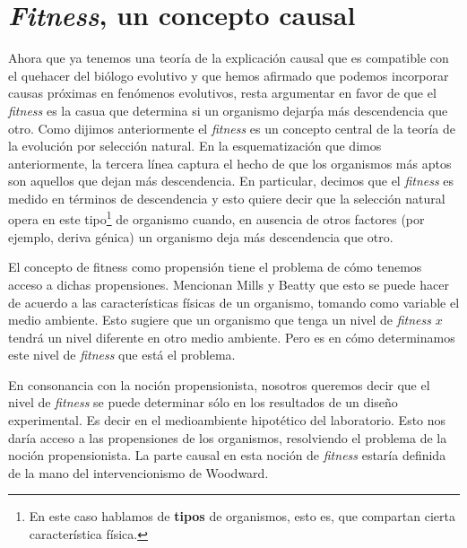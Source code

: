 \section{\emph{Fitness}, un concepto causal}

\noindent Ahora que ya tenemos una teoría de la explicación causal que es compatible con el quehacer del biólogo evolutivo y que hemos afirmado que podemos incorporar causas próximas en fenómenos evolutivos, resta argumentar en favor de que el \emph{fitness} es la casua que determina si un organismo dejarṕa más descendencia que otro. Como dijimos anteriormente el \emph{fitness} es un concepto central de la teoría de la evolución por selección natural. En la esquematización que dimos anteriormente, la tercera línea captura el hecho de que los organismos más aptos son aquellos que dejan más descendencia. En particular, decimos que el \emph{fitness} es medido en términos de descendencia y esto quiere decir que la selección natural opera en este tipo\footnote{En este caso hablamos de \textbf{tipos} de organismos, esto es, que compartan cierta característica física.} de organismo cuando, en ausencia de otros factores (por ejemplo, deriva génica) un organismo deja más descendencia que otro.

El concepto de fitness como propensión tiene el problema de cómo tenemos acceso a dichas propensiones. Mencionan Mills y Beatty \cite{Mills1979} que esto se puede hacer de acuerdo a las características físicas de un organismo, tomando como variable el medio ambiente. Esto sugiere que un organismo que tenga un nivel de \emph{fitness} $x$ tendrá un nivel diferente en otro medio ambiente. Pero es en cómo determinamos este nivel de \emph{fitness} que está el problema.

En consonancia con la noción propensionista, nosotros queremos decir que el nivel de \emph{fitness} se puede determinar sólo en los resultados de un diseño experimental. Es decir en el medioambiente hipotético del laboratorio. Esto nos daría acceso a las propensiones de los organismos, resolviendo el problema de la noción propensionista. La parte causal en esta noción de \emph{fitness} estaría definida de la mano del intervencionismo de Woodward.

